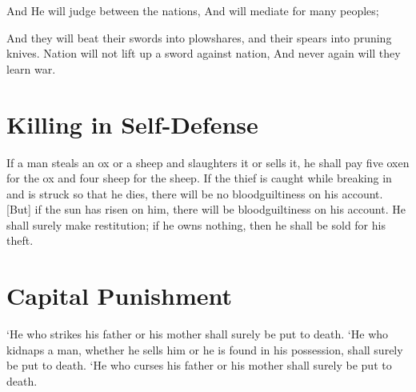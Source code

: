 \vspace{4\baselineskip}
\begin{scripture}[Isaiah 2:4]
    And He will judge between the nations,
    And will mediate for many peoples;

    And they will beat their swords into plowshares, and their spears into pruning knives.
    Nation will not lift up a sword against nation,
    And never again will they learn war.
\end{scripture}

\vspace{4\baselineskip}

\vspace{10\baselineskip}


\section{Killing in Self-Defense}
\begin{scripture}[Exodus 22:1-3]
    If a man steals an ox or a sheep and slaughters it or sells it, he shall pay five oxen for the ox and four sheep for the sheep.
    If the thief is caught while breaking in and is struck so that he dies, there will be no bloodguiltiness on his account.
    [But] if the sun has risen on him, there will be bloodguiltiness on his account. He shall surely make restitution; if he owns nothing, then he shall be sold for his theft.
\end{scripture}

\newpage
\section{Capital Punishment}
\begin{scripture}[Exodus 21:15-17]
    `He who strikes his father or his mother shall surely be put to death.
    `He who kidnaps a man, whether he sells him or he is found in his possession, shall surely be put to death.
    `He who curses his father or his mother shall surely be put to death.
\end{scripture}


